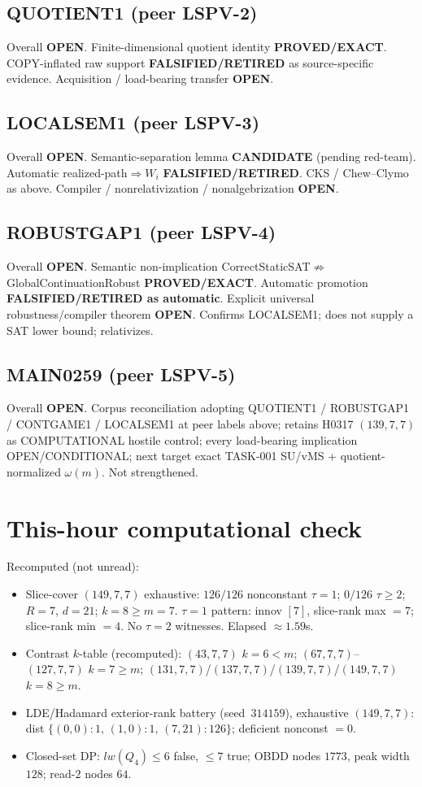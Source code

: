 \documentclass[11pt]{article}
\begin{document}
\subsection*{QUOTIENT1 (peer LSPV-2)}
Overall \textbf{OPEN}. Finite-dimensional quotient identity \textbf{PROVED/EXACT}.
COPY-inflated raw support \textbf{FALSIFIED/RETIRED} as source-specific evidence.
Acquisition / load-bearing transfer \textbf{OPEN}.

\subsection*{LOCALSEM1 (peer LSPV-3)}
Overall \textbf{OPEN}. Semantic-separation lemma \textbf{CANDIDATE} (pending red-team).
Automatic realized-path$\Rightarrow W_i$ \textbf{FALSIFIED/RETIRED}.
CKS / Chew--Clymo as above. Compiler / nonrelativization / nonalgebrization \textbf{OPEN}.

\subsection*{ROBUSTGAP1 (peer LSPV-4)}
Overall \textbf{OPEN}. Semantic non-implication CorrectStaticSAT$\not\Rightarrow$GlobalContinuationRobust
\textbf{PROVED/EXACT}. Automatic promotion \textbf{FALSIFIED/RETIRED as automatic}.
Explicit universal robustness/compiler theorem \textbf{OPEN}. Confirms LOCALSEM1;
does not supply a SAT lower bound; relativizes.

\subsection*{MAIN0259 (peer LSPV-5)}
Overall \textbf{OPEN}. Corpus reconciliation adopting QUOTIENT1 / ROBUSTGAP1 / CONTGAME1 /
LOCALSEM1 at peer labels above; retains H0317 $(139,7,7)$ as COMPUTATIONAL hostile control;
every load-bearing implication OPEN/CONDITIONAL; next target exact TASK-001 SU/vMS +
quotient-normalized $\omega(m)$. Not strengthened.

\section*{This-hour computational check}
Recomputed (not unread):
\begin{itemize}
\item Slice-cover $(149,7,7)$ exhaustive: $126/126$ nonconstant $\tau{=}1$;
  $0/126$ $\tau{\ge}2$; $R{=}7$, $d{=}21$; $k{=}8{\ge}m{=}7$.
  $\tau{=}1$ pattern: innov $[7]$, slice-rank max $=7$; slice-rank min $=4$.
  No $\tau{=}2$ witnesses. Elapsed $\approx1.59$s.
\item Contrast $k$-table (recomputed): $(43,7,7)$ $k{=}6{<}m$;
  $(67,7,7)$--$(127,7,7)$ $k{=}7{\ge}m$; $(131,7,7)$/$(137,7,7)$/$(139,7,7)$/$(149,7,7)$ $k{=}8{\ge}m$.
\item LDE/Hadamard exterior-rank battery (seed~$314159$), exhaustive $(149,7,7)$:
  dist $\{(0,0){:}1,\,(1,0){:}1,\,(7,21){:}126\}$; deficient nonconst $=0$.
\item Closed-set DP: $lw(Q_4)\le6$ false, $\le7$ true; OBDD nodes $1773$, peak width $128$;
  read-$2$ nodes $64$.
\end{itemize}
\end{document}

